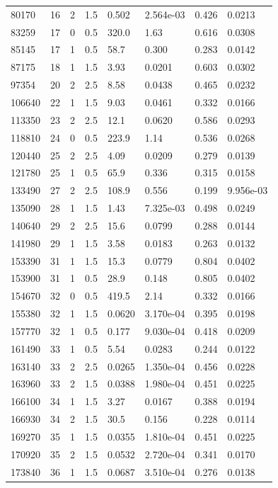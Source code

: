 \documentclass[preview]{standalone}
\begin{document}
{{\begin{tabular}{L{1.2cm}C{1.2cm} C{0.3cm}C{0.5cm} C{1.4cm}C{1.4cm} C{1.4cm}C{1.4cm}}
  80170  &    16  & 2     & 1.5 &  0.502  & 2.564e-03  & 0.426 &  0.0213   \\ 
  83259  &    17  & 0     & 0.5 &  320.0  & 1.63  & 0.616 &  0.0308   \\ 
  85145  &    17  & 1     & 0.5 &  58.7  & 0.300  & 0.283 &  0.0142   \\ 
  87175  &    18  & 1     & 1.5 &  3.93  & 0.0201  & 0.603 &  0.0302   \\ 
  97354  &    20  & 2     & 2.5 &  8.58  & 0.0438  & 0.465 &  0.0232   \\ 
  106640  &    22  & 1     & 1.5 &  9.03  & 0.0461  & 0.332 &  0.0166   \\ 
  113350  &    23  & 2     & 2.5 &  12.1  & 0.0620  & 0.586 &  0.0293   \\ 
  118810  &    24  & 0     & 0.5 &  223.9  & 1.14  & 0.536 &  0.0268   \\ 
  120440  &    25  & 2     & 2.5 &  4.09  & 0.0209  & 0.279 &  0.0139   \\ 
  121780  &    25  & 1     & 0.5 &  65.9  & 0.336  & 0.315 &  0.0158   \\ 
  133490  &    27  & 2     & 2.5 &  108.9  & 0.556  & 0.199 &  9.956e-03   \\ 
  135090  &    28  & 1     & 1.5 &  1.43  & 7.325e-03  & 0.498 &  0.0249   \\ 
  140640  &    29  & 2     & 2.5 &  15.6  & 0.0799  & 0.288 &  0.0144   \\ 
  141980  &    29  & 1     & 1.5 &  3.58  & 0.0183  & 0.263 &  0.0132   \\ 
  153390  &    31  & 1     & 1.5 &  15.3  & 0.0779  & 0.804 &  0.0402   \\ 
  153900  &    31  & 1     & 0.5 &  28.9  & 0.148  & 0.805 &  0.0402   \\ 
  154670  &    32  & 0     & 0.5 &  419.5  & 2.14  & 0.332 &  0.0166   \\ 
  155380  &    32  & 1     & 1.5 &  0.0620  & 3.170e-04  & 0.395 &  0.0198   \\ 
  157770  &    32  & 1     & 0.5 &  0.177  & 9.030e-04  & 0.418 &  0.0209   \\ 
  161490  &    33  & 1     & 0.5 &  5.54  & 0.0283  & 0.244 &  0.0122   \\ 
  163140  &    33  & 2     & 2.5 &  0.0265  & 1.350e-04  & 0.456 &  0.0228   \\ 
  163960  &    33  & 2     & 1.5 &  0.0388  & 1.980e-04  & 0.451 &  0.0225   \\ 
  166100  &    34  & 1     & 1.5 &  3.27  & 0.0167  & 0.388 &  0.0194   \\ 
  166930  &    34  & 2     & 1.5 &  30.5  & 0.156  & 0.228 &  0.0114   \\ 
  169270  &    35  & 1     & 1.5 &  0.0355  & 1.810e-04  & 0.451 &  0.0225   \\ 
  170920  &    35  & 2     & 1.5 &  0.0532  & 2.720e-04  & 0.341 &  0.0170   \\ 
  173840  &    36  & 1     & 1.5 &  0.0687  & 3.510e-04  & 0.276 &  0.0138   \\ 
\hline 
\end{tabular} 

}}
\end{document}
